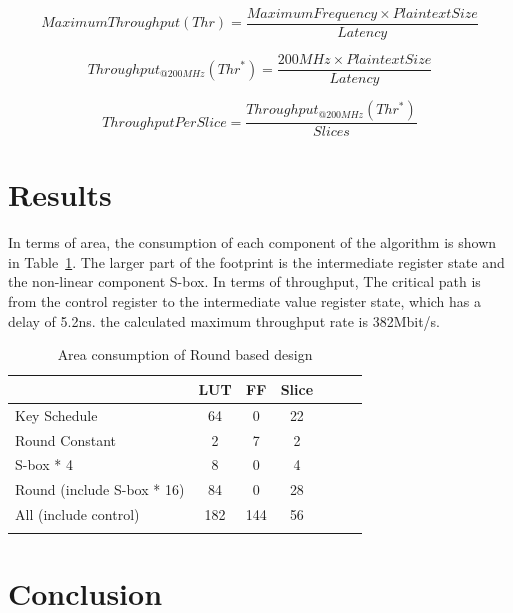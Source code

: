\documentclass[sn-basic]{sn-jnl}%
\begin{document}
\begin{equation}
    Maximum Throughput(Thr) = \frac{Maximum Frequency \times Plaintext Size}{Latency} 
    \label{eq4}
\end{equation}

\begin{equation}
    Throughput_{@200MHz}(Thr^*) = \frac{200MHz \times Plaintext Size}{Latency} 
    \label{eq5}
\end{equation}

\begin{equation}
    ThroughputPerSlice = \frac{Throughput_{@200MHz}(Thr^*)}{Slices} 
    \label{eq6}
\end{equation}

\section{Results}\label{sec5}

In terms of area, the consumption of each component of the algorithm is shown in Table~\ref{area_cost_round_based}.
The larger part of the footprint is the intermediate register state and the non-linear component S-box.
In terms of throughput, The critical path is from the control register to the intermediate value register state, which has a delay of 5.2ns. the calculated maximum throughput rate is 382Mbit/s.

\begin{table}[h]
    \caption{Area consumption of Round based design}\label{area_cost_round_based}%
    \begin{tabular*}{\textwidth}{@{\extracolsep\fill}lcccccc}
        \toprule
        &LUT&	FF&	Slice                                \\
        \midrule
        Key Schedule &	64&	0&	22                           \\
        Round Constant&	2&	7&	2 \\
        S-box * 4&	8&	0&	4                             \\
        Round (include  S-box * 16)&	84&	0&	28                        \\
        All (include control)&	182&	144&	56                     \\
        \botrule
    \end{tabular*}
\end{table}

\section{Conclusion}\label{sec6}

\end{document}

